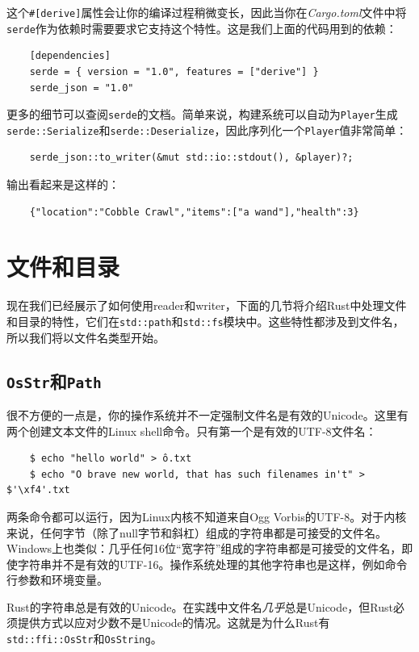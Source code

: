 这个\texttt{\#[derive]}属性会让你的编译过程稍微变长，因此当你在\emph{Cargo.toml}文件中将\texttt{serde}作为依赖时需要要求它支持这个特性。这是我们上面的代码用到的依赖：
\begin{verbatim}
    [dependencies]
    serde = { version = "1.0", features = ["derive"] }
    serde_json = "1.0"
\end{verbatim}

更多的细节可以查阅\texttt{serde}的文档。简单来说，构建系统可以自动为\texttt{Player}生成\texttt{serde::Serialize}和\texttt{serde::Deserialize}，因此序列化一个\texttt{Player}值非常简单：
\begin{verbatim}
    serde_json::to_writer(&mut std::io::stdout(), &player)?;
\end{verbatim}

输出看起来是这样的：
\begin{verbatim}
    {"location":"Cobble Crawl","items":["a wand"],"health":3}
\end{verbatim}

\section{文件和目录}
现在我们已经展示了如何使用reader和writer，下面的几节将介绍Rust中处理文件和目录的特性，它们在\texttt{std::path}和\texttt{std::fs}模块中。这些特性都涉及到文件名，所以我们将以文件名类型开始。

\subsection{\texttt{OsStr}和\texttt{Path}}
很不方便的一点是，你的操作系统并不一定强制文件名是有效的Unicode。这里有两个创建文本文件的Linux shell命令。只有第一个是有效的UTF-8文件名：
\begin{verbatim}
    $ echo "hello world" > ô.txt
    $ echo "O brave new world, that has such filenames in't" > $'\xf4'.txt
\end{verbatim}

两条命令都可以运行，因为Linux内核不知道来自Ogg Vorbis的UTF-8。对于内核来说，任何字节（除了null字节和斜杠）组成的字符串都是可接受的文件名。Windows上也类似：几乎任何16位“宽字符”组成的字符串都是可接受的文件名，即使字符串并不是有效的UTF-16。操作系统处理的其他字符串也是这样，例如命令行参数和环境变量。

Rust的字符串总是有效的Unicode。在实践中文件名\emph{几乎}总是Unicode，但Rust必须提供方式以应对少数不是Unicode的情况。这就是为什么Rust有\texttt{std::ffi::OsStr}和\texttt{OsString}。


